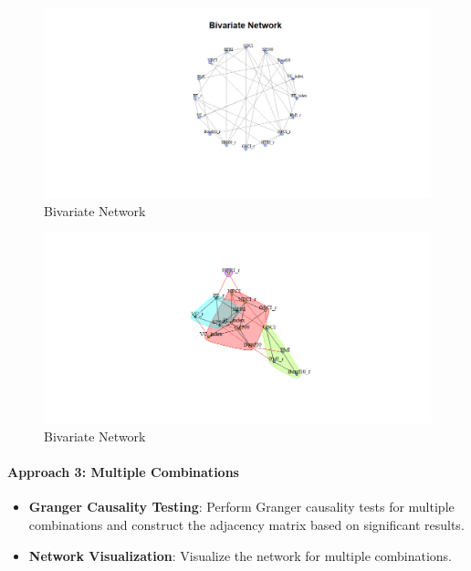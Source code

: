 \documentclass[12pt]{article}
\begin{document}
\begin{figure}[H]
    \centering
    \includegraphics[width=1\linewidth]{Rplot22.png}
    \caption{Bivariate Network}
    \label{fig:enter-label}
\end{figure}
\begin{figure}[H]
    \centering
    \includegraphics[width=1\linewidth]{Rplot23.png}
    \caption{Bivariate Network}
    \label{fig:enter-label}
\end{figure}

\paragraph{Approach 3: Multiple Combinations}
\begin{itemize}
    \item \textbf{Granger Causality Testing}: Perform Granger causality tests for multiple combinations and construct the adjacency matrix based on significant results.
    \item \textbf{Network Visualization}: Visualize the network for multiple combinations.
\end{itemize}
\end{document}

